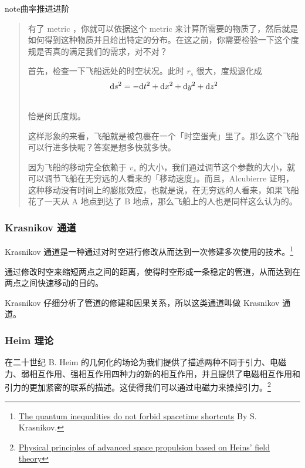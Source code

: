 \documentclass[letterpaper,10pt,english]{sphinxmanual}
\begin{document}
\begin{notice}{note}{曲率推进进阶}
\begin{quote}
有了 metric ，你就可以依据这个 metric 来计算所需要的物质了，然后就是如何得到这种物质并且给出特定的分布。在这之前，你需要检验一下这个度规是否真的满足我们的需求，对不对？

首先，检查一下飞船远处的时空状况。此时 $r_s$ 很大，度规退化成
\begin{gather}
\begin{split}\mathrm ds^2 = -\mathrm dt^2+\mathrm dx ^2 + \mathrm dy^2 + \mathrm dz^2\end{split}\notag\\\begin{split}\end{split}\notag
\end{gather}
恰是闵氏度规。

这样形象的来看，飞船就是被包裹在一个「时空蛋壳」里了。那么这个飞船可以行进多快呢？答案是想多快就多快。

因为飞船的移动完全依赖于 $v_s$ 的大小，我们通过调节这个参数的大小，就可以调节飞船在无穷远的人看来的「移动速度」。而且，Alcubierre 证明，这种移动没有时间上的膨胀效应，也就是说，在无穷远的人看来，如果飞船花了一天从 A 地点到达了 B 地点，那么飞船上的人也是同样这么认为的。
\end{quote}
\end{notice}


\subsubsection{Krasnikov 通道}
\label{physics:krasnikov}
Krasnikov 通道是一种通过对时空进行修改从而达到一次修建多次使用的技术。\footnote{
\href{http://arxiv.org/abs/gr-qc/0207057}{The quantum inequalities do not forbid spacetime shortcuts} By S. Krasnikov.
}

通过修改时空来缩短两点之间的距离，使得时空形成一条稳定的管道，从而达到在两点之间快速移动的目的。

Krasnikov 仔细分析了管道的修建和因果关系，所以这类通道叫做 Krasnikov 通道。


\subsubsection{Heim 理论}
\label{physics:heim}
在二十世纪 B. Heim 的几何化的场论为我们提供了描述两种不同于引力、电磁力、弱相互作用、强相互作用四种力的新的相互作用，并且提供了电磁相互作用和引力的更加紧密的联系的描述。这使得我们可以通过电磁力来操控引力。\footnote{
\href{http://www.hpcc-space.com/publications/documents/PrinciplesOfAdvancedSpacePropulsionAIAA-paper-2002-4094.pdf}{Physical principles of advanced space propulsion based on Heins' field theory}
}
\end{document}

